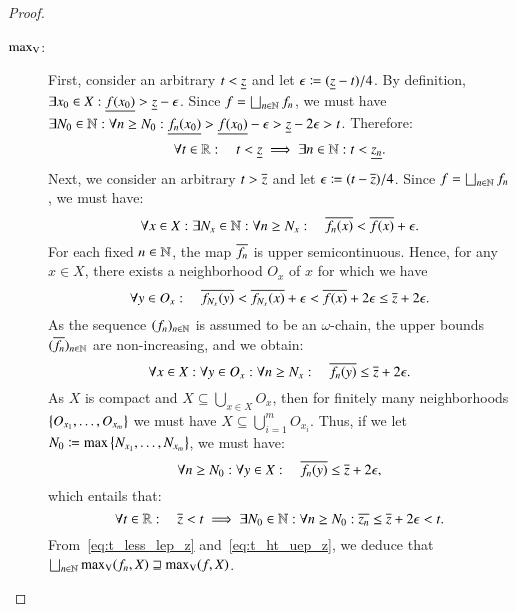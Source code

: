 \documentclass[11pt,times]{article}
\begin{document}
\begin{proof}
  
\begin{description}
\item[$\maxV$:] First, consider an arbitrary $t < \lep[z]$ and let
  $\epsilon \defeq (\lep[z]-t)/4$. By definition,
  $\exists x_0 \in X: \lep[f(x_0)] > \lep[z] - \epsilon$. Since
  $f = \bigsqcup_{n \in \N} f_n$, we must have
  $\exists N_0 \in \N: \forall n \geq N_0: \lep[f_n(x_0)] >
  \lep[f(x_0)] - \epsilon > \lep[z]- 2\epsilon > t$.
  Therefore:
  \begin{equation}
    \label{eq:t_less_lep_z}
    \forall t \in \R: \quad t < \lep[z] \implies \exists n \in \N: t <
    \lep[z_n].
  \end{equation}
  \noindent
  Next, we consider an arbitrary $t > \uep[z]$ and let
  $\epsilon \defeq (t - \uep[z])/4$. Since
  $f = \bigsqcup_{n \in \N} f_n$, we must have:
  \begin{equation*}
    \forall x \in X: \exists N_x \in \N: \forall n \geq N_x: \quad
    \uep[f_n(x)] < \uep[f(x)] + \epsilon.
  \end{equation*}
  For each fixed $n \in \N$, the map $\uep[f_n]$ is upper
  semicontinuous. Hence, for any $x \in X$, there exists a
  neighborhood $O_x$ of $x$ for which we have
  \begin{equation*}
    \forall y \in O_x: \quad \uep[f_{N_x}(y)] < \uep[f_{N_x}(x)] +
    \epsilon < \uep[f(x)] + 2\epsilon \leq \uep[z] + 2\epsilon.
  \end{equation*}
  As the sequence $(f_n)_{n \in \N}$ is assumed to be an
  $\omega$-chain, the upper bounds $(\uep[f_n])_{n \in \N}$ are
  non-increasing, and we obtain:
  \begin{equation*}
    \forall x \in X: \forall y \in O_x: \forall n \geq N_x: \quad
    \uep[f_n(y)] \leq \uep[z] + 2\epsilon.
  \end{equation*}
  As $X$ is compact and $X \subseteq \bigcup_{x \in X} O_x$, then for
  finitely many neighborhoods $\set{O_{x_1}, \ldots, O_{x_m}}$ we must
  have $X \subseteq \bigcup_{i=1}^m O_{x_i}$. Thus, if we let
  $N_0 \defeq \max\set{N_{x_1}, \ldots, N_{x_m}}$, we must have:
  \begin{equation*}
    \forall n \geq N_0: \forall y \in X: \quad \uep[f_n(y)] \leq
    \uep[z] + 2\epsilon,
  \end{equation*}
  which entails that:
  \begin{equation}
    \label{eq:t_ht_uep_z}
    \forall t \in \R: \quad \uep[z] < t \implies \exists N_0 \in \N:
    \forall n \geq N_0:
    \uep[z_n] \leq
    \uep[z] + 2\epsilon < t.
  \end{equation}
  From~\eqref{eq:t_less_lep_z} and~\eqref{eq:t_ht_uep_z}, we deduce
  that $\bigsqcup_{n \in \N} \maxV(f_n,X) \sqsupseteq \maxV(f,X)$.  



\end{description}
\end{proof}
\end{document}
